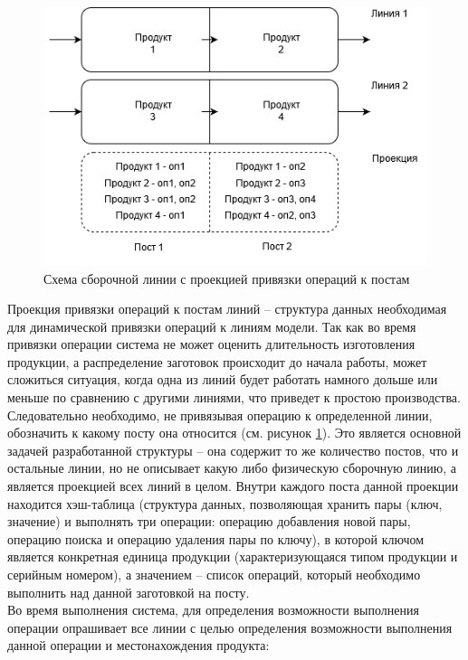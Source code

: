 \begin{figure}[ht]
	\centering
	\includegraphics[width=\linewidth]{pics/assemblyBind.png}
	\caption{Схема сборочной линии с проекцией привязки операций к постам}
	\label{fig:bind}
\end{figure}

\indent Проекция привязки операций к постам линий -- структура данных необходимая для динамической привязки операций к линиям модели.
Так как во время привязки операции система не может оценить длительность изготовления продукции, а распределение заготовок происходит до начала работы, может сложиться ситуация, когда одна из линий будет работать намного дольше или меньше по сравнению с другими линиями, что приведет к простою производства.
Следовательно необходимо, не привязывая операцию к определенной линии, обозначить к какому посту она относится (см. рисунок \ref{fig:bind}).
Это является основной задачей разработанной структуры -- она содержит то же количество постов, что и остальные линии, но не описывает какую либо физическую сборочную линию, а является проекцией всех линий в целом.
Внутри каждого поста данной проекции находится хэш-таблица (структура данных, позволяющая хранить пары (ключ, значение) и выполнять три операции: операцию добавления новой пары, операцию поиска и операцию удаления пары по ключу), в которой ключом является конкретная единица продукции (характеризующаяся типом продукции и серийным номером), а значением -- список операций, который необходимо выполнить над данной заготовкой на посту.\\
\indent Во время выполнения система, для определения возможности выполнения операции опрашивает все линии с целью определения возможности выполнения данной операции и местонахождения продукта:

